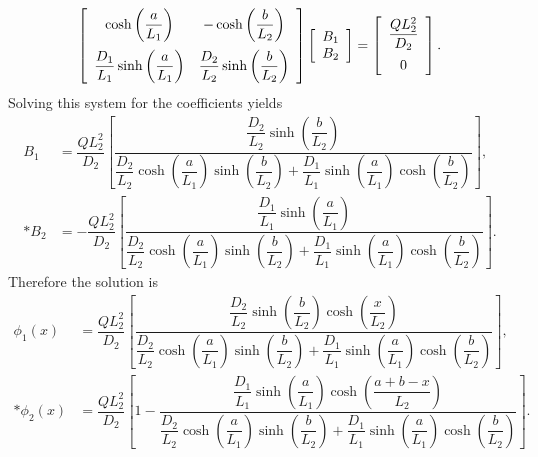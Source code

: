 \begin{align}
  \left[ \begin{array}{c c}
  \cosh \left( \dfrac{a}{L_1} \right)                  & - \cosh \left( \dfrac{b}{L_2} \right) \vspace{0.2cm} \\
  \dfrac{D_1}{L_1} \sinh \left( \dfrac{a}{L_1} \right) & \dfrac{D_2}{L_2} \sinh \left( \dfrac{b}{L_2} \right) \\
  \end{array} \right]
  \left[ \begin{array}{c} B_1 \\ B_2 \\ \end{array} \right] =
  \left[ \begin{array}{c} \dfrac{Q L_2^2}{D_2} \vspace{0.2cm} \\ 0 \end{array} \right] .
\end{align}
Solving this system for the coefficients yields
\begin{subequations}
\begin{align}
  B_1 &= \dfrac{Q L_2^2}{D_2} \left[
         \dfrac{ \dfrac{D_2}{L_2} \sinh \left( \dfrac{b}{L_2} \right) }
               { \dfrac{D_2}{L_2} \cosh \left( \dfrac{a}{L_1} \right) \sinh  \left( \dfrac{b}{L_2} \right)
               + \dfrac{D_1}{L_1} \sinh \left( \dfrac{a}{L_1} \right) \cosh  \left( \dfrac{b}{L_2} \right) } \right], \\*
  B_2 &= -\dfrac{Q L_2^2}{D_2} \left[
         \dfrac{ \dfrac{D_1}{L_1} \sinh \left( \dfrac{a}{L_1} \right) }
               { \dfrac{D_2}{L_2} \cosh \left( \dfrac{a}{L_1} \right) \sinh  \left( \dfrac{b}{L_2} \right)
               + \dfrac{D_1}{L_1} \sinh \left( \dfrac{a}{L_1} \right) \cosh  \left( \dfrac{b}{L_2} \right) } \right].
\end{align}
\end{subequations}
Therefore the solution is
\begin{subequations}
\begin{align}
  \phi_1(x) &= \dfrac{Q L_2^2}{D_2} \left[
         \dfrac{ \dfrac{D_2}{L_2} \sinh \left( \dfrac{b}{L_2} \right) \cosh \left( \dfrac{x}{L_2} \right) }
               { \dfrac{D_2}{L_2} \cosh \left( \dfrac{a}{L_1} \right) \sinh  \left( \dfrac{b}{L_2} \right)
               + \dfrac{D_1}{L_1} \sinh \left( \dfrac{a}{L_1} \right) \cosh  \left( \dfrac{b}{L_2} \right) } \right] , \\*
  \phi_2(x) &= \dfrac{Q L_2^2}{D_2} \left[ 1 -
                \dfrac{ \dfrac{D_1}{L_1} \sinh \left( \dfrac{a}{L_1} \right) \cosh \left( \dfrac{a+b-x}{L_2} \right) }
               { \dfrac{D_2}{L_2} \cosh \left( \dfrac{a}{L_1} \right) \sinh  \left( \dfrac{b}{L_2} \right)
               + \dfrac{D_1}{L_1} \sinh \left( \dfrac{a}{L_1} \right) \cosh  \left( \dfrac{b}{L_2} \right) } \right] .
\end{align}
\end{subequations}

